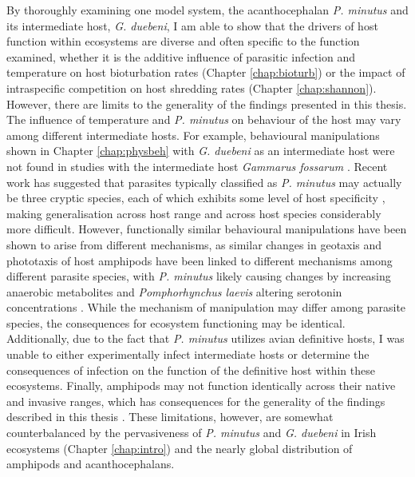 By thoroughly examining one model system, the acanthocephalan \textit{P. minutus} and its intermediate host, \textit{G. duebeni}, I am able to show that the drivers of host function within ecosystems are diverse and often specific to the function examined, whether it is the additive influence of parasitic infection and temperature on host bioturbation rates (Chapter \ref{chap:bioturb}) or the impact of intraspecific competition on host shredding rates (Chapter \ref{chap:shannon}). However, there are limits to the generality of the findings presented in this thesis. The influence of temperature and \textit{P. minutus} on behaviour of the host may vary among different intermediate hosts. For example, behavioural manipulations shown in Chapter \ref{chap:physbeh} with \textit{G. duebeni} as an intermediate host were not found in studies with the intermediate host \textit{Gammarus fossarum} \citep{labaude2017}. Recent work has suggested that parasites typically classified as \textit{P. minutus} may actually be three cryptic species, each of which exhibits some level of host specificity \citep{zittel2018}, making generalisation across host range and across host species considerably more difficult. However, functionally similar behavioural manipulations have been shown to arise from different mechanisms, as similar changes in geotaxis and phototaxis of host amphipods have been linked to different mechanisms among different parasite species, with \textit{P. minutus} likely causing changes by increasing anaerobic metabolites \citep{perrot2016} and \textit{Pomphorhynchus laevis} altering serotonin concentrations \citep{perrot2014}. While the mechanism of manipulation may differ among parasite species, the consequences for ecosystem functioning may be identical. Additionally, due to the fact that \textit{P. minutus} utilizes avian definitive hosts, I was unable to either experimentally infect intermediate hosts or determine the consequences of infection on the function of the definitive host within these ecosystems. Finally, amphipods may not function identically across their native and invasive ranges, which has consequences for the generality of the findings described in this thesis \citep{little2018, tonin2018}. These limitations, however, are somewhat counterbalanced by the pervasiveness of \textit{P. minutus} and \textit{G. duebeni} in Irish ecosystems (Chapter \ref{chap:intro}) and the nearly global distribution of amphipods and acanthocephalans.

